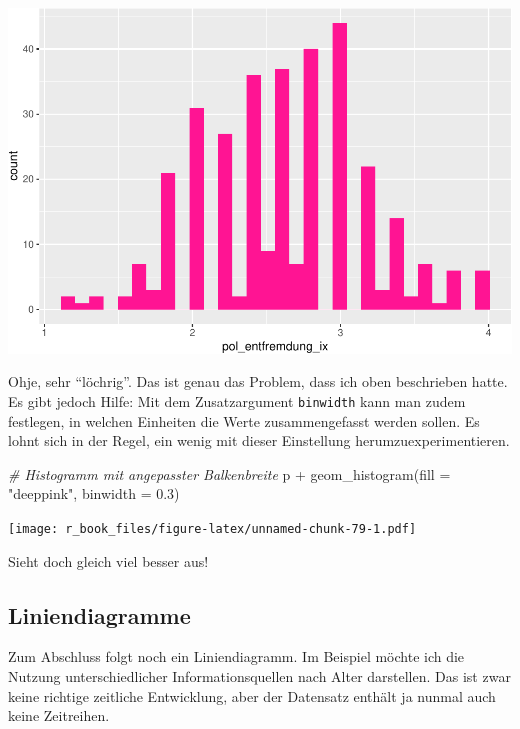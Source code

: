 \documentclass[
]{book}
\newenvironment{Shaded}{\begin{snugshade}}{\end{snugshade}}
\newcommand{\AttributeTok}[1]{\textcolor[rgb]{0.77,0.63,0.00}{#1}}
\newcommand{\CommentTok}[1]{\textcolor[rgb]{0.56,0.35,0.01}{\textit{#1}}}
\newcommand{\FloatTok}[1]{\textcolor[rgb]{0.00,0.00,0.81}{#1}}
\newcommand{\FunctionTok}[1]{\textcolor[rgb]{0.00,0.00,0.00}{#1}}
\newcommand{\NormalTok}[1]{#1}
\newcommand{\SpecialCharTok}[1]{\textcolor[rgb]{0.00,0.00,0.00}{#1}}
\newcommand{\StringTok}[1]{\textcolor[rgb]{0.31,0.60,0.02}{#1}}
\begin{document}
\includegraphics{r_book_files/figure-latex/unnamed-chunk-78-1.pdf}

Ohje, sehr ``löchrig''. Das ist genau das Problem, dass ich oben beschrieben hatte. Es gibt jedoch Hilfe: Mit dem Zusatzargument \texttt{binwidth} kann man zudem festlegen, in welchen Einheiten die Werte zusammengefasst werden sollen. Es lohnt sich in der Regel, ein wenig mit dieser Einstellung herumzuexperimentieren.

\begin{Shaded}
\begin{Highlighting}[]
\CommentTok{\# Histogramm mit angepasster Balkenbreite}
\NormalTok{p }\SpecialCharTok{+} \FunctionTok{geom\_histogram}\NormalTok{(}\AttributeTok{fill =} \StringTok{"deeppink"}\NormalTok{, }\AttributeTok{binwidth =} \FloatTok{0.3}\NormalTok{) }
\end{Highlighting}
\end{Shaded}

\texttt{[image: r\_book\_files/figure-latex/unnamed-chunk-79-1.pdf]}

Sieht doch gleich viel besser aus!

\hypertarget{liniendiagramme}{%
\subsection{Liniendiagramme}\label{liniendiagramme}}

Zum Abschluss folgt noch ein Liniendiagramm. Im Beispiel möchte ich die Nutzung unterschiedlicher Informationsquellen nach Alter darstellen. Das ist zwar keine richtige zeitliche Entwicklung, aber der Datensatz enthält ja nunmal auch keine Zeitreihen.
\end{document}
